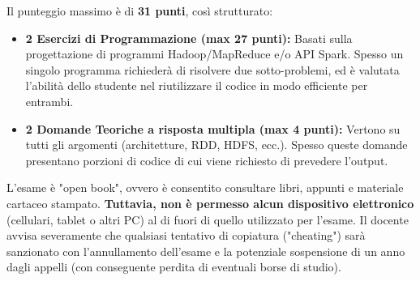 Il punteggio massimo è di \textbf{31 punti}, così strutturato:
\begin{itemize}
    \item \textbf{2 Esercizi di Programmazione (max 27 punti):} Basati sulla progettazione di programmi Hadoop/MapReduce e/o API Spark. Spesso un singolo programma richiederà di risolvere due sotto-problemi, ed è valutata l'abilità dello studente nel riutilizzare il codice in modo efficiente per entrambi.
    \item \textbf{2 Domande Teoriche a risposta multipla (max 4 punti):} Vertono su tutti gli argomenti (architetture, RDD, HDFS, ecc.). Spesso queste domande presentano porzioni di codice di cui viene richiesto di prevedere l'output.
\end{itemize}

\begin{remark}
L'esame è "open book", ovvero è consentito consultare libri, appunti e materiale cartaceo stampato. \textbf{Tuttavia, non è permesso alcun dispositivo elettronico} (cellulari, tablet o altri PC) al di fuori di quello utilizzato per l'esame. Il docente avvisa severamente che qualsiasi tentativo di copiatura ("cheating") sarà sanzionato con l'annullamento dell'esame e la potenziale sospensione di un anno dagli appelli (con conseguente perdita di eventuali borse di studio).
\end{remark}